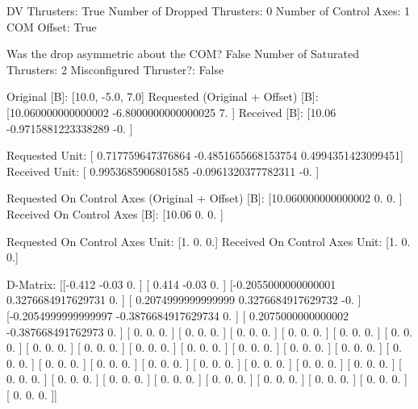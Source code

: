 DV Thrusters:	True
Number of Dropped Thrusters:	0
Number of Control Axes:	1
COM Offset:	True

Was the drop asymmetric about the COM?	False
Number of Saturated Thrusters:	2
Misconfigured Thruster?:	False

Original [B]:	[10.0, -5.0, 7.0]
Requested (Original + Offset) [B]:	[10.060000000000002  -6.8000000000000025  7.                ]
Received [B]:		[10.06               -0.9715881223338289 -0.                ]

Requested Unit:		[ 0.717759647376864  -0.4851655668153754  0.4994351423099451]
Received Unit:		[ 0.9953685906801585 -0.0961320377782311 -0.                ]

Requested On Control Axes (Original + Offset) [B]:	[10.060000000000002  0.                 0.               ]
Received On Control Axes [B]:		[10.06  0.    0.  ]

Requested On Control Axes Unit:		[1. 0. 0.]
Received On Control Axes Unit:		[1. 0. 0.]

D-Matrix:
[[-0.412              -0.03                0.                ]
 [ 0.414              -0.03                0.                ]
 [-0.2055000000000001  0.3276684917629731  0.                ]
 [ 0.2074999999999999  0.3276684917629732 -0.                ]
 [-0.2054999999999997 -0.3876684917629734  0.                ]
 [ 0.2075000000000002 -0.387668491762973   0.                ]
 [ 0.                  0.                  0.                ]
 [ 0.                  0.                  0.                ]
 [ 0.                  0.                  0.                ]
 [ 0.                  0.                  0.                ]
 [ 0.                  0.                  0.                ]
 [ 0.                  0.                  0.                ]
 [ 0.                  0.                  0.                ]
 [ 0.                  0.                  0.                ]
 [ 0.                  0.                  0.                ]
 [ 0.                  0.                  0.                ]
 [ 0.                  0.                  0.                ]
 [ 0.                  0.                  0.                ]
 [ 0.                  0.                  0.                ]
 [ 0.                  0.                  0.                ]
 [ 0.                  0.                  0.                ]
 [ 0.                  0.                  0.                ]
 [ 0.                  0.                  0.                ]
 [ 0.                  0.                  0.                ]
 [ 0.                  0.                  0.                ]
 [ 0.                  0.                  0.                ]
 [ 0.                  0.                  0.                ]
 [ 0.                  0.                  0.                ]
 [ 0.                  0.                  0.                ]
 [ 0.                  0.                  0.                ]
 [ 0.                  0.                  0.                ]
 [ 0.                  0.                  0.                ]
 [ 0.                  0.                  0.                ]
 [ 0.                  0.                  0.                ]
 [ 0.                  0.                  0.                ]
 [ 0.                  0.                  0.                ]]

